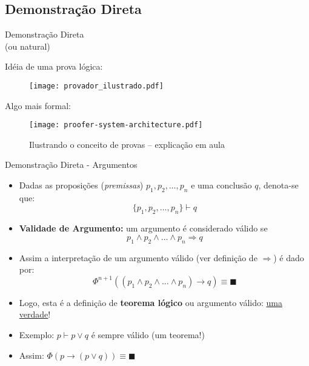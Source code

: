 \subsection{Demonstração Direta}

\begin{frame}[t]
\vskip 3cm
\begin{center}
{\Huge Demonstração Direta\\(ou natural)}
\end{center}
\end{frame}


\begin{frame}[t]{Idéia de uma prova lógica:}

\begin{figure}[!ht]
\centering 
\texttt{[image: provador\_ilustrado.pdf]}
\end{figure}
\end{frame}


\begin{frame}[t]{Algo mais formal:}

\begin{figure}[!htb]
\centering 
\texttt{[image: proofer-system-architecture.pdf]}
\caption{Ilustrando o conceito de provas -- explicação em aula}
\label{fig_-system-architecture}
\end{figure}
\end{frame}






\begin{frame}[t]{Demonstração Direta - Argumentos}
	\begin{itemize}
	\item Dadas as proposições ({\em premissas}) $p_1, p_2, \ldots, p_n$ e uma conclusão $q$, denota-se que: $$\{p_1, p_2, \ldots, p_n \} \vdash q$$
	
	\item {\bf Validade de Argumento:} um argumento é considerado válido se 
	$$p_1 \wedge p_2 \wedge \ldots \wedge p_n \Rightarrow q $$
	
	\item Assim a interpretação de um argumento válido (ver definição de $\Rightarrow$) é dado por: 
		$$\Phi^{n+1} ((p_1 \wedge p_2 \wedge \ldots \wedge p_n) \rightarrow q) \equiv \blacksquare$$
	
	\item Logo, esta é a definição de \textbf{teorema lógico} ou argumento válido: \underline{uma verdade}!
	
	\item Exemplo: $p \vdash p \vee q$ é sempre válido (um teorema!)
	
 \item Assim: $\Phi (p  \rightarrow ( p \vee q)) \equiv \blacksquare $
\end{itemize}
\end{frame}



